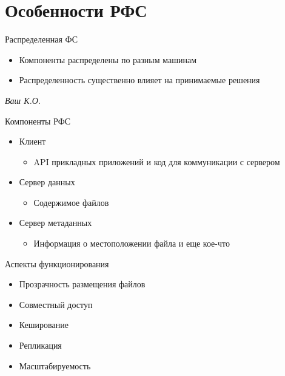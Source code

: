 \documentclass[sans]{beamer}
\begin{document}
\section {Особенности РФС}

\begin{frame}{Распределенная ФС}
	\begin{itemize}
		\item Компоненты распределены по разным машинам
		\item Распределенность существенно влияет на принимаемые решения
	\end{itemize}
	\hfill
	{\it Ваш К.О.}
\end{frame}

\begin{frame}{Компоненты РФС}
	\begin{itemize}
		\item {\color{red} Клиент}
		\begin{itemize}
			\item API прикладных приложений и код для коммуникации с сервером
		\end{itemize}

		\item {\color{red} Сервер данных}

		\begin{itemize}
			\item Содержимое файлов
		\end{itemize}

		\item {\color{red} Сервер метаданных}

		\begin{itemize}
			\item Информация о местоположении файла и еще кое-что
		\end{itemize}
	\end{itemize}
\end{frame}

\begin{frame}{Аспекты функционирования}
	\begin{itemize}
		\item Прозрачность размещения файлов
		\item Совместный доступ
		\item Кеширование
		\item Репликация
		\item Масштабируемость
	\end{itemize}
\end{frame}
\end{document}
